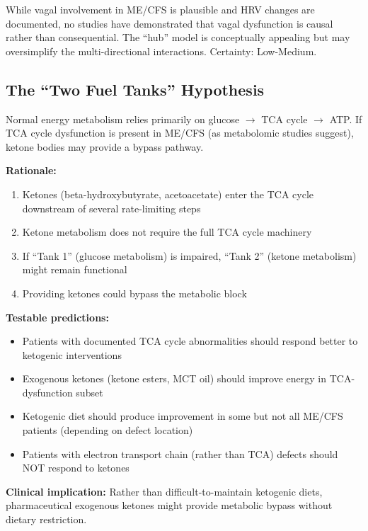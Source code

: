 \begin{warning}
While vagal involvement in ME/CFS is plausible and HRV changes are documented, no studies have demonstrated that vagal dysfunction is causal rather than consequential. The ``hub'' model is conceptually appealing but may oversimplify the multi-directional interactions. Certainty: Low-Medium.
\end{warning}

\subsection{The ``Two Fuel Tanks'' Hypothesis}
\label{sec:two-fuel-tanks}

\begin{hypothesis}
\label{hyp:ketone-bypass}
Normal energy metabolism relies primarily on glucose $\rightarrow$ TCA cycle $\rightarrow$ ATP. If TCA cycle dysfunction is present in ME/CFS (as metabolomic studies suggest), ketone bodies may provide a bypass pathway.

\textbf{Rationale:}
\begin{enumerate}
    \item Ketones (beta-hydroxybutyrate, acetoacetate) enter the TCA cycle downstream of several rate-limiting steps
    \item Ketone metabolism does not require the full TCA cycle machinery
    \item If ``Tank 1'' (glucose metabolism) is impaired, ``Tank 2'' (ketone metabolism) might remain functional
    \item Providing ketones could bypass the metabolic block
\end{enumerate}

\textbf{Testable predictions:}
\begin{itemize}
    \item Patients with documented TCA cycle abnormalities should respond better to ketogenic interventions
    \item Exogenous ketones (ketone esters, MCT oil) should improve energy in TCA-dysfunction subset
    \item Ketogenic diet should produce improvement in some but not all ME/CFS patients (depending on defect location)
    \item Patients with electron transport chain (rather than TCA) defects should NOT respond to ketones
\end{itemize}

\textbf{Clinical implication:} Rather than difficult-to-maintain ketogenic diets, pharmaceutical exogenous ketones might provide metabolic bypass without dietary restriction.
\end{hypothesis}

